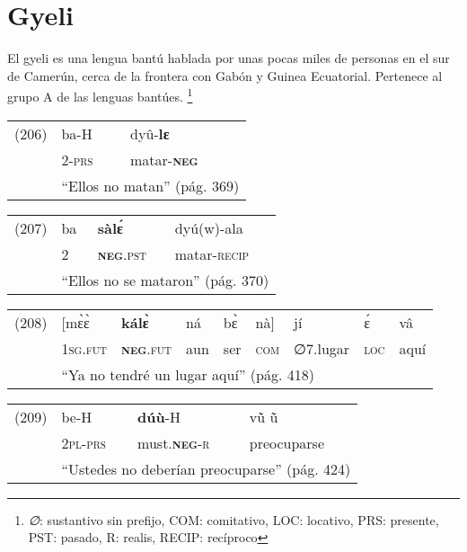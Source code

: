 \section*{Gyeli}

\noindent El gyeli es una lengua bantú hablada por unas pocas miles de personas en el sur de Camerún, cerca de la frontera con Gabón y Guinea Ecuatorial. Pertenece al grupo A de las lenguas bantúes.
\footnote{{\setmainfont{Charis SIL} \textit{∅}}: sustantivo sin prefijo, COM: comitativo, LOC: locativo, PRS: presente, PST: pasado, R: realis, RECIP: recíproco}
\vspace{0.3cm}

{\setmainfont{Charis SIL} 

\begin{tabular}{lll}
(206) & ba-H & dyû-\textbf{lɛ} \\
& \textsc{2-prs} & matar-\textsc{\textbf{neg}} \\
& \multicolumn{2}{l}{``Ellos no matan'' (pág. 369)}
\end{tabular} \vspace{0.3cm}

\begin{tabular}{llll}
(207) & ba & \textbf{sàlɛ́} & dyú(w)-ala \\
& 2 & \textsc{\textbf{neg}.pst} & matar-\textsc{recip}\\
& \multicolumn{3}{l}{``Ellos no se mataron'' (pág. 370)}
\end{tabular} \vspace{0.3cm}

\begin{tabular}{lllllllll}
(208) & [mɛ̀ɛ̀ & \textbf{kálɛ̀} & ná & bɛ̀ & nà] & jí & ɛ́ & vâ \\
& \textsc{1sg.fut} & \textsc{\textbf{neg}.fut} & aun & ser & \textsc{com} & \textsc{∅7}.lugar & \textsc{loc} & aquí \\
& \multicolumn{8}{l}{``Ya no tendré un lugar aquí'' (pág. 418)}
\end{tabular} \vspace{0.3cm}

\begin{tabular}{llll}
(209) & be-H & \textbf{dúù}-H & vũ̀ ũ̀ \\
& \textsc{2pl-prs} & must.\textsc{\textbf{neg}-r} & preocuparse \\
& \multicolumn{3}{l}{``Ustedes no deberían preocuparse'' (pág. 424)}
\end{tabular} \vspace{0.3cm}

}
